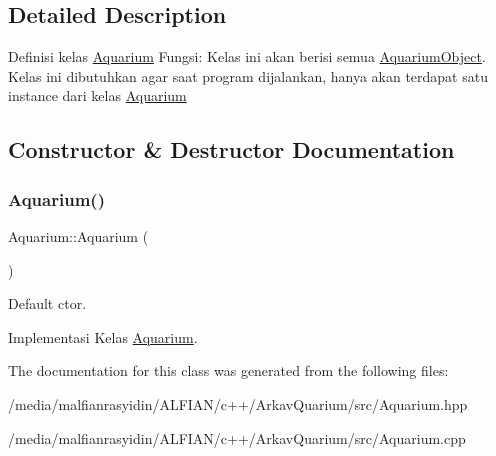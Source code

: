 \subsection{Detailed Description}
Definisi kelas \mbox{\hyperlink{class_aquarium}{Aquarium}} Fungsi\+: Kelas ini akan berisi semua \mbox{\hyperlink{class_aquarium_object}{Aquarium\+Object}}. Kelas ini dibutuhkan agar saat program dijalankan, hanya akan terdapat satu instance dari kelas \mbox{\hyperlink{class_aquarium}{Aquarium}} 

\subsection{Constructor \& Destructor Documentation}
\mbox{\label{class_aquarium_a0176cc59bd34e39fd3d79d56d4db4d08}} 
\subsubsection{\texorpdfstring{Aquarium()}{Aquarium()}}
{\footnotesize\ttfamily Aquarium\+::\+Aquarium (\begin{DoxyParamCaption}{ }\end{DoxyParamCaption})}



Default ctor. 

Implementasi Kelas \mbox{\hyperlink{class_aquarium}{Aquarium}}. 

The documentation for this class was generated from the following files\+:\begin{DoxyCompactItemize}
\item 
/media/malfianrasyidin/\+A\+L\+F\+I\+A\+N/c++/\+Arkav\+Quarium/src/Aquarium.\+hpp\item 
/media/malfianrasyidin/\+A\+L\+F\+I\+A\+N/c++/\+Arkav\+Quarium/src/Aquarium.\+cpp\end{DoxyCompactItemize}
